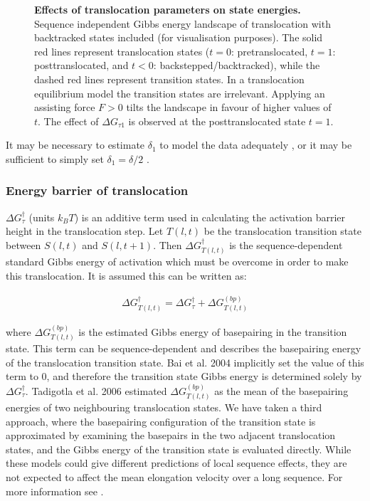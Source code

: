 \documentclass[10pt,letterpaper]{article}
\begin{document}
\begin{figure}[!h]
\caption{{\bf Effects of translocation parameters on state energies.}
Sequence independent Gibbs energy landscape of translocation with backtracked states included (for visualisation purposes). The solid red lines represent translocation states ($t=0$: pretranslocated, $t=1$: posttranslocated, and $t<0$: backstepped/backtracked), while the dashed red lines represent transition states. In a translocation equilibrium model the transition states are irrelevant. Applying an assisting force $F>0$ tilts the landscape in favour of higher values of $t$. The effect of $\Delta G_{\tau 1}$ is observed at the posttranslocated state $t=1$.}
\label{fig3}
\end{figure}


It may be necessary to estimate $\delta_1$ to model the data adequately \cite{maoileidigh2011unified}, or it may be sufficient to simply set $\delta_1 = \delta / 2$ \cite{depken2009origin}. \\


\subsubsection*{Energy barrier of translocation}


$\Delta G^\dag_{\tau}$ (units $k_BT$) is an additive term used in calculating the activation barrier height in the translocation step. Let $T(l,t)$ be the translocation transition state between $S(l,t)$ and $S(l,t+1)$. Then $\Delta G_{T(l,t)}^{\dag}$ is the sequence-dependent standard Gibbs energy of activation which must be overcome in order to make this translocation. It is assumed this can be written as:



\begin{eqnarray}
	\Delta G_{T(l,t)}^{\dag} = \Delta G^\dag_{\tau} + \Delta G_{T(l,t)}^{(bp)}
\end{eqnarray}

where $\Delta G_{T(l,t)}^{(bp)}$ is the estimated Gibbs energy of basepairing in the transition state. This term can be sequence-dependent and describes the basepairing energy of the translocation transition state. Bai et al. 2004 \cite{bai2004sequence} implicitly set the value of this term to 0, and therefore the transition state Gibbs energy is determined solely by $\Delta G^\dag_{\tau}$. Tadigotla et al. 2006 \cite{tadigotla2006thermodynamic} estimated $\Delta G_{T(l,t)}^{(bp)}$ as the mean of the basepairing energies of two neighbouring translocation states. We have taken a third approach, where the basepairing configuration of the transition state is approximated by examining the basepairs in the two adjacent translocation states, and the Gibbs energy of the transition state is evaluated directly.
While these models could give different predictions of local sequence effects, they are not expected to affect the mean elongation velocity over a long sequence. For more information see .
\end{document}
